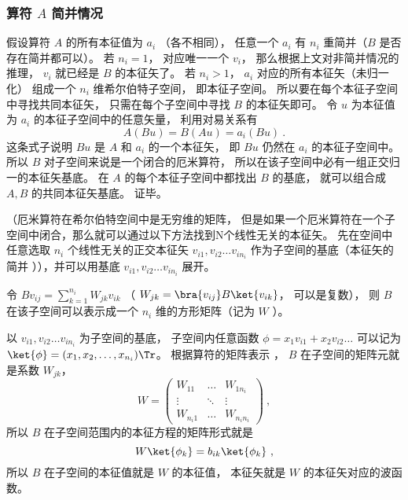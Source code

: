 \subsubsection{算符 $A$ 简并情况}
假设算符 $A$ 的所有本征值为 $a_i$ （各不相同）， 任意一个 $a_i$ 有 $n_i$ 重简并（$B$ 是否存在简并都可以）。 若 $n_i = 1$，  对应唯一一个 $v_i$，  那么根据上文对非简并情况的推理， $v_i$ 就已经是 $B$ 的本征矢了。 若 $n_i > 1$， $a_i$ 对应的所有本征矢（未归一化） 组成一个 $n_i$ 维希尔伯特子空间， 即本征子空间。 所以要在每个本征子空间中寻找共同本征矢， 只需在每个子空间中寻找 $B$ 的本征矢即可。 令 $u$ 为本征值为 $a_i$ 的本征子空间中的任意矢量， 利用对易关系有
\begin{equation}
A (B u) = B (A u) = a_i (B u)~.
\end{equation}
这条式子说明 $B u$ 是 $A$ 和 $a_i$ 的一个本征矢， 即 $B u$ 仍然在 $a_i$ 的本征子空间中。 所以 $B$ 对子空间来说是一个闭合的厄米算符， 所以在该子空间中必有一组正交归一的本征矢基底。 在 $A$ 的每个本征子空间中都找出 $B$ 的基底， 就可以组合成 $A, B$ 的共同本征矢基底。 证毕。


（厄米算符在希尔伯特空间中是无穷维的矩阵， 但是如果一个厄米算符在一个子空间中闭合，那么就可以通过以下方法找到N个线性无关的本征矢。%
先在空间中任意选取 $n_i$ 个线性无关的正交本征矢 $v_{i1}, v_{i2}\dots v_{i n_i}$ 作为子空间的基底（本征矢的简并%
）），并可以用基底 $v_{i1}, v_{i2}\dots v_{i n_i}$ 展开。

令 $B v_{ij} = \sum_{k=1}^{n_i} W_{jk}v_{ik}$ （ $W_{jk} = \bra{v_{ij}} B \ket{v_{ik}}$， 可以是复数）， 则 $B$ 在该子空间可以表示成一个 $n_i$ 维的方形矩阵（记为 $W$ ）。

以 $v_{i1}, v_{i2} \dots v_{i n_i}$ 为子空间的基底， 子空间内任意函数 $\phi  = x_1 v_{i1} + x_2 v_{i2}\dots$ 可以记为 $\ket{\phi} = (x_1, x_2, \dots, x_{n_i})\Tr$。 根据算符的矩阵表示
， $B$ 在子空间的矩阵元就是系数 $W_{jk}$， 
\begin{equation}
W = \begin{pmatrix}
W_{11} & \ldots & W_{1 n_i}\\
\vdots & \ddots & \vdots \\
W_{n_i 1} & \ldots & W_{n_i n_i}
\end{pmatrix}~,
\end{equation}
所以 $B$ 在子空间范围内的本征方程的矩阵形式就是
\begin{equation}
W \ket{\phi_k} = b_{ik} \ket{\phi_k}~,
\end{equation}
所以 $B$ 在子空间的本征值就是 $W$ 的本征值， 本征矢就是 $W$ 的本征矢对应的波函数。

